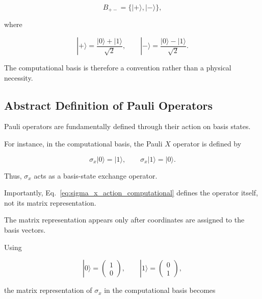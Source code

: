 \begin{equation}
B_{+-}
=
\{
|+\rangle,
|-\rangle
\},
\label{eq:plus_minus_basis_appendix}
\end{equation}

where

\begin{equation}
|+\rangle
=
\frac{|0\rangle+|1\rangle}{\sqrt{2}},
\qquad
|-\rangle
=
\frac{|0\rangle-|1\rangle}{\sqrt{2}}.
\label{eq:plus_minus_states_appendix}
\end{equation}

The computational basis is therefore a convention rather than a physical necessity.


\subsection*{Abstract Definition of Pauli Operators}

Pauli operators are fundamentally defined through their action on basis states.

For instance, in the computational basis, the Pauli \(X\) operator is defined by

\begin{equation}
\sigma_x |0\rangle = |1\rangle,
\qquad
\sigma_x |1\rangle = |0\rangle.
\label{eq:sigma_x_action_computational}
\end{equation}

Thus, \( \sigma_x \) acts as a basis-state exchange operator.

\medskip

Importantly, Eq.~\eqref{eq:sigma_x_action_computational} defines the operator itself, not its matrix representation.

The matrix representation appears only after coordinates are assigned to the basis vectors.

Using

\[
|0\rangle
=
\begin{pmatrix}
1\\
0
\end{pmatrix},
\qquad
|1\rangle
=
\begin{pmatrix}
0\\
1
\end{pmatrix},
\]

the matrix representation of \( \sigma_x \) in the computational basis becomes

